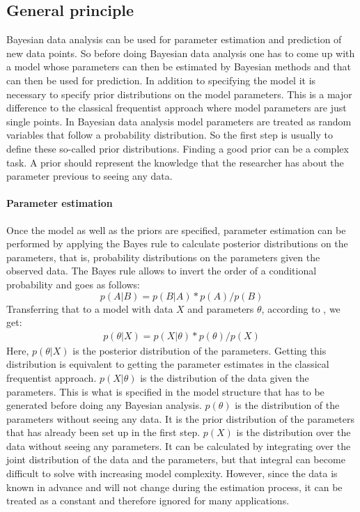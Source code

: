 \documentclass{article}
\begin{document}
\subsection{General principle}
\label{subsec: General principle}
Bayesian data analysis can be used for parameter estimation and prediction of new data points. So before doing Bayesian data analysis one has to come up with a model whose parameters can then be estimated by Bayesian methods and that can then be used for prediction. In addition to specifying the model it is necessary to specify prior distributions on the model parameters. This is a major difference to the classical frequentist approach where model parameters are just single points. In Bayesian data analysis model parameters are treated as random variables that follow a probability distribution. So the first step is usually to define these so-called prior distributions. Finding a good prior can be a complex task. A prior should represent the knowledge that the researcher has about the parameter previous to seeing any data.
\paragraph{Parameter estimation}
Once the model as well as the priors are specified, parameter estimation can be performed by applying the Bayes rule to calculate posterior distributions on the parameters, that is, probability distributions on the parameters given the observed data. The Bayes rule allows to invert the order of a conditional probability and goes as follows:
\begin{equation}
p(A|B) = p(B|A) * p(A)/p(B)
\end{equation}
Transferring that to a model with data $X$ and parameters $\theta$, according to \cite{1439840954}, we get:
\begin{equation}
\label{eq:Bayes_formula}
\begin{split}
p(\theta|X) = p(X|\theta) * p(\theta)/p(X)
\end{split}
\end{equation}
Here, $p(\theta|X)$ is the posterior distribution of the parameters. Getting this distribution is equivalent to getting the parameter estimates in the classical frequentist approach. $p(X|\theta)$ is the distribution of the data given the parameters. This is what is specified in the model structure that has to be generated before doing any Bayesian analysis. $p(\theta)$ is the distribution of the parameters without seeing any data. It is the prior distribution of the parameters that has already been set up in the first step. $p(X)$ is the distribution over the data without seeing any parameters. It can be calculated by integrating over the joint distribution of the data and the parameters, but that integral can become difficult to solve with increasing model complexity. However, since the data is known in advance and will not change during the estimation process, it can be treated as a constant and therefore ignored for many applications.
\end{document}
